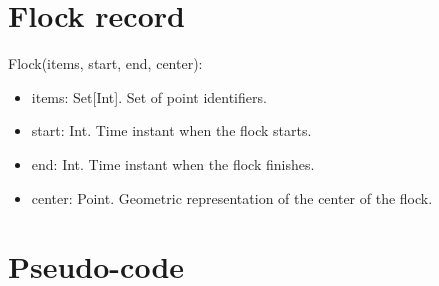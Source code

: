 \documentclass{article}
\begin{document}
    \section*{Flock record}
    Flock(items, start, end, center):
    \begin{itemize}
        \item items: Set[Int].  Set of point identifiers.
        \item start: Int.  Time instant when the flock starts. 
        \item end:   Int.  Time instant when the flock finishes.
        \item center: Point.  Geometric representation of the center of the flock.
    \end{itemize}
    
    \section*{Pseudo-code}
\end{document}
